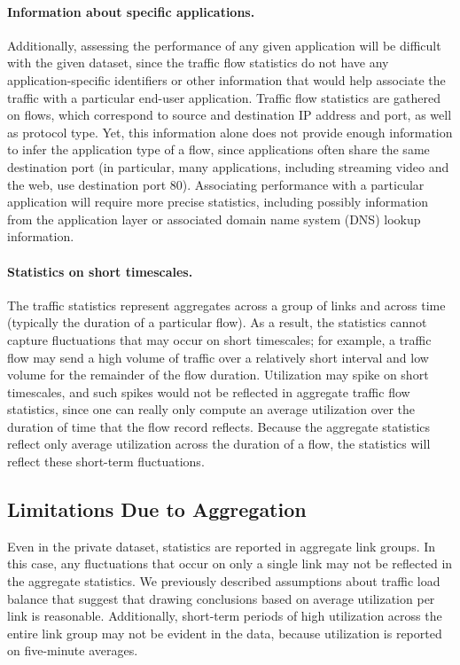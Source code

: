 \paragraph{Information about specific applications.} Additionally,
assessing the performance of any given application will be difficult
with the given dataset, since the traffic flow statistics do not have
any application-specific identifiers or other information that would
help associate the traffic with a particular end-user
application. Traffic flow statistics are gathered on
flows, which correspond to source and destination IP address and port,
as well as protocol type. Yet, this information alone does not provide
enough information to infer the application type of a flow, since
applications often share the same destination port (in particular, many
applications, including streaming video and the web, use destination
port 80). Associating performance with a particular application
will require more precise statistics, including possibly information from the
application layer or associated domain name system (DNS) lookup
information.

\paragraph{Statistics on short timescales.} The
traffic statistics represent aggregates across a group of links and
across time (typically the duration of a particular flow). As a result,
the statistics cannot capture fluctuations that may occur on short
timescales; for example, a traffic flow may send a high volume of
traffic over a relatively short interval and low volume for the
remainder of the flow duration. 
Utilization may spike on short timescales, and such spikes
would not be reflected in aggregate traffic flow statistics, since one
can really only compute an average utilization over the duration of time
that the flow record reflects. 
Because the aggregate statistics reflect
only average utilization across the duration of a flow, the statistics
will reflect these short-term fluctuations. 

\subsection{Limitations Due to Aggregation}

Even in the private dataset, statistics are reported in aggregate link
groups. In this case, any fluctuations that occur on only a single link
may not be reflected in the aggregate statistics. We previously
described assumptions about traffic load balance that suggest that
drawing conclusions based on average utilization per link is reasonable.
Additionally, short-term periods of high utilization across the entire
link group may not be evident in the data, because utilization is
reported on five-minute averages.


